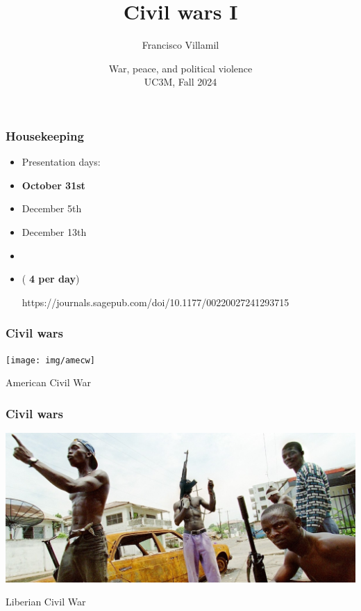 \documentclass[aspectratio=43]{beamer}
\title{\huge Civil wars I}
\author{Francisco Villamil}
\date{War, peace, and political violence\\UC3M, Fall 2024}
\begin{document}
\begin{frame}
  \titlepage
\end{frame}

\begin{frame}
\frametitle{Housekeeping}
\centering

\begin{itemize}
  \item[] Presentation days:
  \item \textbf{October 31st}
  \item December 5th
  \item December 13th
  \item[]
  \item (\textbf{ 4 per day})

https://journals.sagepub.com/doi/10.1177/00220027241293715
  
\end{itemize}


\end{frame}
  


\begin{frame}
\frametitle{Civil wars}
\centering

\texttt{[image: img/amecw]}

American Civil War

\end{frame}

\begin{frame}
\frametitle{Civil wars}
\centering

\includegraphics[width = \textwidth]{img/liberia}

Liberian Civil War

\end{frame}
\end{document}
